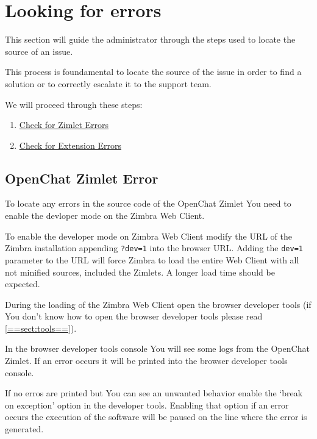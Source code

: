 \section{Looking for errors}

This section will guide the administrator through the steps used to locate the source of an issue.

This process is foundamental to locate the source of the issue in order to find a solution or to correctly escalate it
to the support team.

We will proceed through these steps:
\begin{enumerate}

    \item \hyperref[{==sect:zim-err==}]{Check for Zimlet Errors} \begin{comment}\ref{==sect:zim-err==}\end{comment}
    \item \hyperref[{==sect:ext-err==}]{Check for Extension Errors} \begin{comment}\ref{==sect:ext-err==}\end{comment}
\end{enumerate}

\subsection[Zimlet Error]{OpenChat Zimlet Error}
\label{==sect:zim-err==}
To locate any errors in the source code of the OpenChat Zimlet You need to enable the devloper mode on the Zimbra Web Client.

To enable the developer mode on Zimbra Web Client modify the URL of the Zimbra installation appending \verb+?dev=1+ into
the browser URL. Adding the \verb+dev=1+ parameter to the URL will force Zimbra to load the entire Web Client with all not
minified sources, included the Zimlets. A longer load time should be expected.

During the loading of the Zimbra Web Client open the browser developer tools (if You don't know how to open the browser
developer tools please read \ref{==sect:tools==}).

In the browser developer tools console You will see some logs from the OpenChat Zimlet. If an error occurs it will be printed into
the browser developer tools console.

If no erros are printed but You can see an unwanted behavior enable the `break on exception' option in the developer tools.
Enabling that option if an error occurs the execution of the software will be paused on the line where the error is generated.

